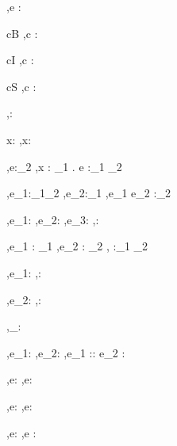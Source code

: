 



  {\Gamma,\Sigma \infers e : \tau}


  {c\in B}
  {\Gamma,\Sigma\infers c : \Bool}

  {c\in I}
  {\Gamma,\Sigma\infers c : \Int}

  {c\in S}
  {\Gamma,\Sigma\infers c : \String}


  { }
  {\Gamma,\Sigma\infers \unit : \Unit}


  {x:\tau\in\Gamma}
  {\Gamma,\Sigma\infers x:\tau}


  {\Gamma[x:\tau_1] ,\Sigma \infers e:\tau_2}
  {\Gamma,\Sigma \infers \lambda x : \tau_1 . e :\tau_1 \to \tau_2}

  { {\Gamma,\Sigma \infers e_1:\tau_1\to\tau_2 } \Quad
  {\Gamma,\Sigma \infers e_2:\tau_1}}
  {\Gamma,\Sigma \infers e_1 e_2 :\tau_2}


  { {\Gamma,\Sigma \infers e_1:\Bool}\Quad
   { {\Gamma,\Sigma \infers e_2:\tau}\Quad
   {\Gamma,\Sigma \infers e_3:\tau}}}
  {\Gamma,\Sigma \infers {}:\tau}


    {\Gamma,\Sigma \infers e_1 : \tau_1  \Quad
     \Gamma,\Sigma \infers e_2 : \tau_2}
    {\Gamma,\Sigma \infers {} :\tau_1 \times \tau_2}

  {\Gamma,\Sigma\infers e_1:\tau}
  {\Gamma,\Sigma\infers \Fst {}:\tau}

    {\Gamma,\Sigma\infers e_2:\tau}
    {\Gamma,\Sigma\infers \Snd {}:\tau}

  { }
  {\Gamma,\Sigma\infers [\ ]_\beta : \List\beta}

  { {\Gamma,\Sigma\infers e_1:\beta}\Quad
   {\Gamma,\Sigma\infers e_2:\List\beta}}
  {\Gamma,\Sigma\infers e_1 :: e_2 : \List \beta}

  {\Gamma,\Sigma\infers e:\List\beta}
  {\Gamma,\Sigma\infers \Head e:\beta}

    {\Gamma,\Sigma\infers e:\List\beta}
    {\Gamma,\Sigma\infers \Tail e:\List\beta}



  {\Gamma,\Sigma \infers e:\beta}
  {\Gamma,\Sigma \infers \Ref e :\Reference \beta}

